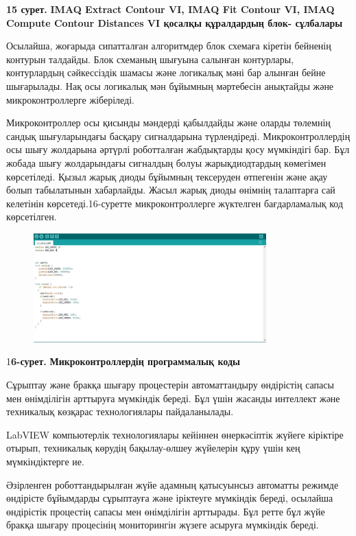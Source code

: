 {\bfseries 15 сурет.} {\bfseries IMAQ Extract Contour VI, IMAQ Fit Contour VI,
IMAQ Compute Contour Distances VI қосалқы құралдардың блок- сұлбалары}

Осылайша, жоғарыда сипатталған алгоритмдер блок схемаға кіретін бейненің
контурын талдайды. Блок схеманың шығуына салынған контурлары,
контурлардың сәйкессіздік шамасы және логикалық мәні бар алынған бейне
шығарылады. Нақ осы логикалық мән бұйымның мәртебесін анықтайды және
микроконтроллерге жіберіледі.

Микроконтроллер осы қисынды мәндерді қабылдайды және оларды төлемнің
сандық шығуларындағы басқару сигналдарына түрлендіреді.
Микроконтроллердің осы шығу жолдарына әртүрлі роботталған жабдықтарды
қосу мүмкіндігі бар. Бұл жобада шығу жолдарындағы сигналдың болуы
жарықдиодтардың көмегімен көрсетіледі. Қызыл жарық диоды бұйымның
тексеруден өтпегенін және ақау болып табылатынын хабарлайды. Жасыл жарық
диоды өнімнің талаптарға сай келетінін көрсетеді.16-суретте
микроконтроллерге жүктелген бағдарламалық код көрсетілген.


\begin{figure}[H]
	\centering
	\includegraphics[width=0.8\textwidth]{media/ict2/image186}
	\caption*{}
\end{figure}


1{\bfseries 6-сурет.} {\bfseries Микроконтроллердің программалық коды}

Сұрыптау және бракқа шығару процестерін автоматтандыру өндірістің сапасы
мен өнімділігін арттыруға мүмкіндік береді. Бұл үшін жасанды интеллект
және техникалық көзқарас технологиялары пайдаланылады.

LabVIEW компьютерлік технологиялары кейіннен өнеркәсіптік жүйеге
кіріктіре отырып, техникалық көрудің бақылау-өлшеу жүйелерін құру үшін
кең мүмкіндіктерге ие.

Әзірленген роботтандырылған жүйе адамның қатысуынсыз автоматты режимде
өндірісте бұйымдарды сұрыптауға және іріктеуге мүмкіндік береді,
осылайша өндірістік процестің сапасы мен өнімділігін арттырады. Бұл
ретте бұл жүйе бракқа шығару процесінің мониторингін жүзеге асыруға
мүмкіндік береді.

